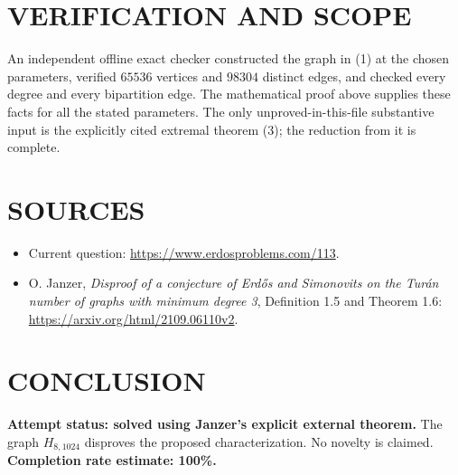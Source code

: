 \section{VERIFICATION AND SCOPE}
An independent offline exact checker constructed the graph in (1) at the chosen parameters, verified $65536$ vertices and $98304$ distinct edges, and checked every degree and every bipartition edge. The mathematical proof above supplies these facts for all the stated parameters. The only unproved-in-this-file substantive input is the explicitly cited extremal theorem (3); the reduction from it is complete.

\section{SOURCES}
\begin{itemize}
\item Current question: \url{https://www.erdosproblems.com/113}.
\item O. Janzer, \emph{Disproof of a conjecture of Erd\H{o}s and Simonovits on the Tur\'an number of graphs with minimum degree 3}, Definition 1.5 and Theorem 1.6: \url{https://arxiv.org/html/2109.06110v2}.
\end{itemize}

\section{CONCLUSION}
\textbf{Attempt status: solved using Janzer's explicit external theorem.} The graph $H_{8,1024}$ disproves the proposed characterization. No novelty is claimed.
\textbf{Completion rate estimate: 100\%.}
